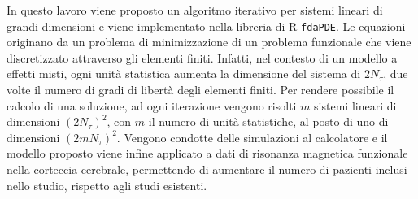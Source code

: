 
In questo lavoro viene proposto un algoritmo iterativo per sistemi
lineari di grandi dimensioni e viene implementato nella libreria di
R \texttt{fdaPDE}.
Le equazioni originano da un problema di minimizzazione di un
problema funzionale che viene discretizzato attraverso gli elementi
finiti. Infatti, nel contesto di un modello a effetti misti, ogni
unità statistica aumenta la dimensione del sistema di $2 N_{\tau}$, 
due volte il numero di gradi di libertà degli elementi finiti.\newline
Per rendere possibile il calcolo di una soluzione, ad ogni iterazione
vengono risolti $m$ sistemi lineari di dimensioni
$\left(2 N_{\tau}\right)^2$, con $m$ il numero di unità statistiche,
al posto di uno di dimensioni $\left(2m N_{\tau}\right)^2$.\newline
Vengono condotte delle simulazioni al calcolatore e il modello proposto
viene infine applicato a dati di risonanza magnetica funzionale nella
corteccia cerebrale, permettendo di aumentare il numero di pazienti
inclusi nello studio, rispetto agli studi esistenti.

